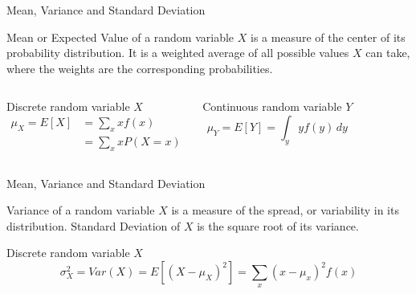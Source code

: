 \documentclass{beamer}\usepackage[]{graphicx}\usepackage[]{color}
\begin{document}
\begin{darkframes}
	
	
	\begin{frame}[label=lists]{Mean, Variance and Standard Deviation}
		
		\begin{definition}
			\alert{Mean} or \alert{Expected Value} of a random variable $X$ is a measure of the center of its probability distribution. It is a weighted average of all possible values $X$ can take, where the weights are the corresponding probabilities. 
		\end{definition} \pause
	

		\begin{columns}[T,onlytextwidth]
        \begin{center}
      	Discrete random variable $X$
      	\begin{align*}
          \mu_X = E[X] &= \sum_x x f(x) \\ &= \sum_x x P(X=x)
        \end{align*}
        \end{center}
      	
        \begin{center}
      	Continuous random variable $Y$
      	$$
			\mu_Y = E[Y] = \int_y y f(y) \, dy	        	
      	$$
        \end{center}
      	        
    \end{columns}


				
	\end{frame}





	\begin{frame}[label=lists]{Mean, Variance and Standard Deviation}
		
		\begin{definition}
			\alert{Variance} of a random variable $X$ is a measure of the spread, or variability in its distribution. \alert{Standard Deviation} of $X$ is the square root of its variance.
		\end{definition}  \pause
		
        	Discrete random variable $X$
        	$$
				\sigma^2_X = Var(X) = E[(X-\mu_X)^2] = \sum_x (x-\mu_x)^2 f(x)	        	
        	$$   \pause
        	

\end{frame}
\end{darkframes}
\end{document}
